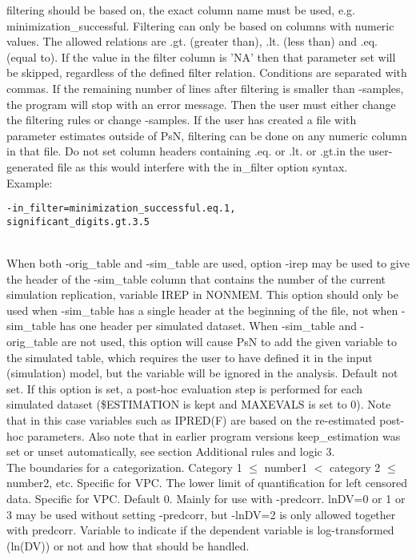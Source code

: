 \begin{optionlist}
filtering should be based on, the exact column name must be used, e.g. minimization\_successful. Filtering can only be based on columns 
with numeric values. The allowed relations are .gt. (greater than), .lt. (less than) and .eq. (equal to). If the value in the filter 
column is 'NA' then that parameter set will be skipped, regardless of the defined filter relation. Conditions are separated with commas. 
If the remaining number of lines after filtering is smaller than -samples, the program will stop with an error message. 
Then the user must either change the filtering rules or change -samples. If the user has created a file with parameter estimates outside 
of PsN, filtering can be done on any numeric column in that file. Do not set column headers containing .eq. or .lt. or .gt.in the 
user-generated file as this would interfere with the in\_filter option syntax.\\
Example:
\begin{verbatim}
-in_filter=minimization_successful.eq.1,
significant_digits.gt.3.5
\end{verbatim} \\
\nextopt
{}
When both -orig\_table and -sim\_table are used, option -irep may be used to give the header of the -sim\_table column 
that contains the number of the current simulation replication, variable IREP in NONMEM. This option should only be used
when -sim\_table has a single header at the beginning of the file, not when -sim\_table has one header per simulated dataset.
When -sim\_table and -orig\_table are not used, this option will cause PsN to add the given variable to the simulated table,
which requires the user to have defined it in the input (simulation) model, but the variable will be ignored in the analysis.
\nextopt
{}
Default not set. If this option is set, a post-hoc evaluation step is performed for each simulated dataset (\mbox{\$ESTIMATION} is kept and MAXEVALS is set to 0). Note that in this case variables such as IPRED(F) are based on the re-estimated post-hoc parameters. Also note that in earlier program versions keep\_estimation was set or unset automatically, see section Additional rules and logic 3.\\
\nextopt
{}
The boundaries for a categorization. Category 1 $\leq$ number1 $<$ category 2 $\leq$ number2, etc. Specific for VPC. 
\nextopt
{}
The lower limit of quantification for left censored data. Specific for VPC. 
\nextopt
{}
Default 0. Mainly for use with -predcorr. lnDV=0 or 1 or 3 may be used without setting -predcorr, but -lnDV=2 is only allowed together with predcorr. Variable to indicate if the dependent variable is log-transformed (ln(DV)) or not and how that should be handled.

\end{optionlist}
